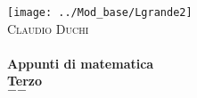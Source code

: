\frontmatter
\begin{titlepage}
	
	\begin{center}
		
		
		
		\texttt{[image: ../Mod\_base/Lgrande2]}\\[1cm]    
		\textsc{\LARGE Claudio Duchi}\\[1.5cm]
		
		
		
		\HRule \\[0.4cm]
		{ \huge \bfseries Appunti di matematica}\\[0.4cm]
		{\bfseries Terzo}\\[0.4cm]
		\vfill
		{\large $-$\DTMnow$-$}
	\end{center}
	
\end{titlepage}
\setcounter{page}{2}

\tableofcontents 
\cleardoublepage
\listoftables
{}
\cleardoublepage
\listoffigures
{}
\cleardoublepage\renewcommand{}
\lstlistoflistings{}
\mainmatter%

{}

\printindex

